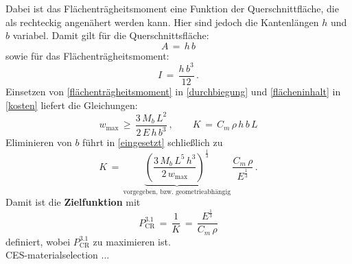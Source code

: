 Dabei ist das Flächenträgheitsmoment eine Funktion der Querschnittfläche, die als rechteckig angenähert werden kann. Hier sind jedoch die Kantenlängen $h$ und $b$ variabel. Damit gilt für die Querschnittsfläche:
\begin{equation} \label{flächeninhalt}
A\,=\,h\,b
\end{equation}
sowie für das Flächenträgheitsmoment:
\begin{equation} \label{flächenträgheitsmoment}
I\,=\,\frac{h\,b^3}{12}\,.
\end{equation}
Einsetzen von \ref{flächenträgheitsmoment} in \ref{durchbiegung} und \ref{flächeninhalt} in \ref{kosten} liefert die Gleichungen:
\begin{equation} \label{eingesetzt}
	w_{\text{max}}\,\ge\,\frac{3\,M_b \,L^2}{2\,E\,h\,b^3}\,, \qquad
	K\,=\,C_m\,\rho\,h\,b\,L
\end{equation}
Eliminieren von $b$ führt in \ref{eingesetzt} schließlich zu
\begin{equation}\label{performance}
K\,=\,\underbrace{\left(\frac{3\,M_b\,L^5\,h^3}{2\,w_{\text{max}}}\right)^{\frac{1}{3}}}_\text{vorgegeben, bzw. geometrieabhängig}\,\frac{C_m\,\rho}{E^{\frac{1}{3}}}\,.
\end{equation}
Damit ist die \textbf{Zielfunktion} mit
\begin{equation} \label{zielfkt1}
P_{\text{CR}}^{3.1}\,=\,\frac{1}{K}\,=\,\frac{E^\frac{1}{3}}{C_m\,\rho}
\end{equation}
definiert, wobei $P_{\text{CR}}^{3.1}$ zu maximieren ist.\\
CES-materialselection ...

